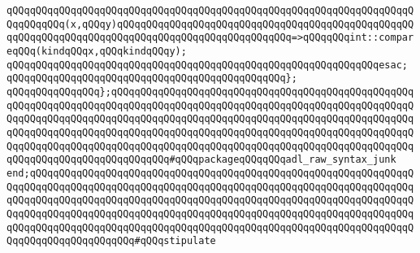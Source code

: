 \newline
\verb|qQQqqQQqqQQqqQQqqQQqqQQqqQQqqQQqqQQqqQQqqQQqqQQqqQQqqQQqqQQqqQQqqQQqqQQqqQQqqQQq(x,qQQqy)qQQqqQQqqQQqqQQqqQQqqQQqqQQqqQQqqQQqqQQqqQQqqQQqqQQqqQQqqQQqqQQqqQQqqQQqqQQqqQQqqQQqqQQqqQQqqQQqqQQq=>qQQqqQQqint::compareqQQq(kindqQQqx,qQQqkindqQQqy);|\newline
\verb|qQQqqQQqqQQqqQQqqQQqqQQqqQQqqQQqqQQqqQQqqQQqqQQqqQQqqQQqqQQqqQQqesac;|\newline
\verb|qQQqqQQqqQQqqQQqqQQqqQQqqQQqqQQqqQQqqQQqqQQqqQQq};|\newline
\verb|qQQqqQQqqQQqqQQq};qQQqqQQqqQQqqQQqqQQqqQQqqQQqqQQqqQQqqQQqqQQqqQQqqQQqqQQqqQQqqQQqqQQqqQQqqQQqqQQqqQQqqQQqqQQqqQQqqQQqqQQqqQQqqQQqqQQqqQQqqQQqqQQqqQQqqQQqqQQqqQQqqQQqqQQqqQQqqQQqqQQqqQQqqQQqqQQqqQQqqQQqqQQqqQQqqQQqqQQqqQQqqQQqqQQqqQQqqQQqqQQqqQQqqQQqqQQqqQQqqQQqqQQqqQQqqQQqqQQqqQQqqQQqqQQqqQQqqQQqqQQqqQQqqQQqqQQqqQQqqQQqqQQqqQQqqQQqqQQqqQQqqQQqqQQqqQQqqQQqqQQqqQQqqQQqqQQqqQQq#qQQqpackageqQQqqQQqadl_raw_syntax_junk|\newline
\verb|end;qQQqqQQqqQQqqQQqqQQqqQQqqQQqqQQqqQQqqQQqqQQqqQQqqQQqqQQqqQQqqQQqqQQqqQQqqQQqqQQqqQQqqQQqqQQqqQQqqQQqqQQqqQQqqQQqqQQqqQQqqQQqqQQqqQQqqQQqqQQqqQQqqQQqqQQqqQQqqQQqqQQqqQQqqQQqqQQqqQQqqQQqqQQqqQQqqQQqqQQqqQQqqQQqqQQqqQQqqQQqqQQqqQQqqQQqqQQqqQQqqQQqqQQqqQQqqQQqqQQqqQQqqQQqqQQqqQQqqQQqqQQqqQQqqQQqqQQqqQQqqQQqqQQqqQQqqQQqqQQqqQQqqQQqqQQqqQQqqQQqqQQqqQQqqQQqqQQqqQQqqQQqqQQq#qQQqstipulate|\newline

